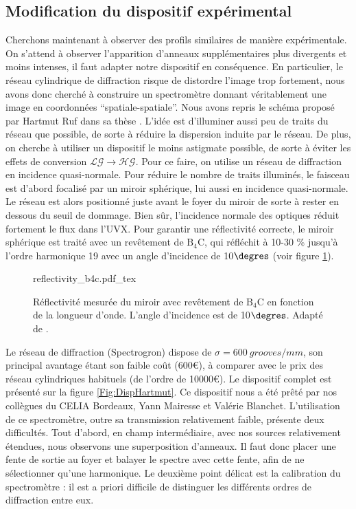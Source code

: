 \subsection{Modification du dispositif expérimental}
Cherchons maintenant à observer des profils similaires de manière expérimentale. On s'attend à observer l'apparition d'anneaux supplémentaires plus divergents et moins intenses, il faut adapter notre dispositif en conséquence. En particulier, le réseau cylindrique de diffraction risque de distordre l'image trop fortement, nous avons donc cherché à construire un spectromètre donnant véritablement une image en coordonnées ``spatiale-spatiale''. 
Nous avons repris le schéma proposé par Hartmut Ruf dans sa thèse . L'idée est d'illuminer aussi peu de traits du réseau que possible, de sorte à réduire la dispersion induite par le réseau. De plus, on cherche à utiliser un dispositif le moins astigmate possible, de sorte à éviter les effets de conversion $\mathcal{LG}\rightarrow \mathcal{HG}$. Pour ce faire, on utilise un réseau de diffraction en incidence quasi-normale. Pour réduire le nombre de traits illuminés, le faisceau est d'abord focalisé par un miroir sphérique, lui aussi en incidence quasi-normale. Le réseau est alors positionné juste avant le foyer du miroir de sorte à rester en dessous du seuil de dommage. Bien sûr, l'incidence normale des optiques réduit fortement le flux dans l'UVX. Pour garantir une réflectivité correcte, le miroir sphérique est traité avec un revêtement de $\mathrm{B}_\mathrm{4}\mathrm{C}$, qui réfléchit à 10-30 \% jusqu'à l'ordre harmonique 19 avec un angle d'incidence de 10$\degres$ (voir figure \ref{Fig:reflectivity_B4C}). 

\begin{figure}[!ht]
\centering
\def\svgwidth{.6\columnwidth}
{reflectivity_b4c.pdf_tex}
\caption{Réflectivité mesurée du miroir avec revêtement de $\mathrm{B}_\mathrm{4}\mathrm{C}$ en fonction de la longueur d'onde. L'angle d'incidence est de 10$\degres$. Adapté de .}
\label{Fig:reflectivity_B4C}
\end{figure}

Le réseau de diffraction (Spectrogron) dispose de $\sigma=\SI{600}{grooves/mm}$, son principal avantage étant son faible coût (600€), à comparer avec le prix des réseau cylindriques habituels (de l'ordre de 10000€). Le dispositif complet est présenté sur la figure \ref{Fig:DispHartmut}. Ce dispositif nous a été prêté par nos collègues du CELIA Bordeaux, Yann Mairesse et Valérie Blanchet. L'utilisation de ce spectromètre, outre sa transmission relativement faible, présente deux difficultés. Tout d'abord, en champ intermédiaire, avec nos sources relativement étendues, nous observons une superposition d'anneaux. Il faut donc placer une fente de sortie au foyer et balayer le spectre avec cette fente, afin de ne sélectionner qu'une harmonique. Le deuxième point délicat est la calibration du spectromètre : il est a priori difficile de distinguer les différents ordres de diffraction entre eux. 

